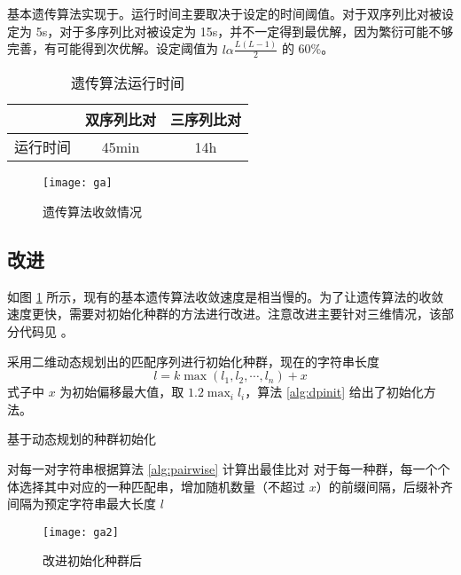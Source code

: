     基本遗传算法实现于。运行时间主要取决于设定的时间阈值。对于双序列比对被设定为 5s，对于多序列比对被设定为 15s，并不一定得到最优解，因为繁衍可能不够完善，有可能得到次优解。设定阈值为 $l\alpha\frac{L(L-1)}{2}$ 的 60\%。

    \noindent
    \begin{minipage}{0.6\textwidth}
        \begin{table}[H]
            \centering
            \caption{遗传算法运行时间}\label{tab:ga}
            \begin{tabular}{ccc}
                \toprule
                 & 双序列比对 & 三序列比对 \\
                \midrule
                运行时间 & 45min & 14h \\
                \bottomrule
            \end{tabular}
        \end{table}
    \end{minipage}
    \begin{minipage}{0.4\textwidth}
        \begin{figure}[H]
            \centering
            \texttt{[image: ga]}
            \caption{遗传算法收敛情况}\label{fig:ga}
        \end{figure}
    \end{minipage}
    \vspace*{5pt}

    \subsection{改进}

    如图 \ref{fig:ga} 所示，现有的基本遗传算法收敛速度是相当慢的。为了让遗传算法的收敛速度更快，需要对初始化种群的方法进行改进。注意改进主要针对三维情况，该部分代码见 。

    采用二维动态规划出的匹配序列进行初始化种群\cite{simplega}，现在的字符串长度
    \begin{equation}
        l = k\max{(l_1,l_2,\cdots,l_n)}+x
    \end{equation}
    式子中 $x$ 为初始偏移最大值，取 $1.2\max_i{l_i}$，算法 \ref{alg:dpinit} 给出了初始化方法。

    \noindent
    \begin{minipage}{0.6\textwidth}
        \begin{algorithm}[H]
            \caption{基于动态规划的种群初始化}\label{alg:dpinit}
            对每一对字符串根据算法 \ref{alg:pairwise} 计算出最佳比对\;
            对于每一种群，每一个个体选择其中对应的一种匹配串，增加随机数量（不超过 $x$）的前缀间隔，后缀补齐间隔为预定字符串最大长度 $l$\;
        \end{algorithm}
    \end{minipage}
    \begin{minipage}{0.4\textwidth}
        \begin{figure}[H]
            \centering
            \texttt{[image: ga2]}
            \caption{改进初始化种群后}\label{fig:ga2}
        \end{figure}
    \end{minipage}
    \vspace*{5pt}


